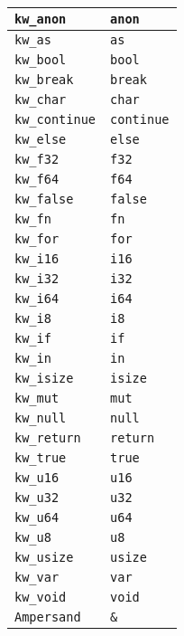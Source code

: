 \begin{xltabular}{\textwidth}{l|X}
	\texttt{kw\_anon} & \texttt{anon} \\ \hline
	\texttt{kw\_as} & \texttt{as} \\ \hline
	\texttt{kw\_bool} & \texttt{bool} \\ \hline
	\texttt{kw\_break} & \texttt{break} \\ \hline
	\texttt{kw\_char} & \texttt{char} \\ \hline
	\texttt{kw\_continue} & \texttt{continue} \\ \hline
	\texttt{kw\_else} & \texttt{else} \\ \hline
	\texttt{kw\_f32} & \texttt{f32} \\ \hline
	\texttt{kw\_f64} & \texttt{f64} \\ \hline
	\texttt{kw\_false} & \texttt{false} \\ \hline
	\texttt{kw\_fn} & \texttt{fn} \\ \hline
	\texttt{kw\_for} & \texttt{for} \\ \hline
	\texttt{kw\_i16} & \texttt{i16} \\ \hline
	\texttt{kw\_i32} & \texttt{i32} \\ \hline
	\texttt{kw\_i64} & \texttt{i64} \\ \hline
	\texttt{kw\_i8} & \texttt{i8} \\ \hline
	\texttt{kw\_if} & \texttt{if} \\ \hline
	\texttt{kw\_in} & \texttt{in} \\ \hline
	\texttt{kw\_isize} & \texttt{isize} \\ \hline
	\texttt{kw\_mut} & \texttt{mut} \\ \hline
	\texttt{kw\_null} & \texttt{null} \\ \hline
	\texttt{kw\_return} & \texttt{return} \\ \hline
	\texttt{kw\_true} & \texttt{true} \\ \hline
	\texttt{kw\_u16} & \texttt{u16} \\ \hline
	\texttt{kw\_u32} & \texttt{u32} \\ \hline
	\texttt{kw\_u64} & \texttt{u64} \\ \hline
	\texttt{kw\_u8} & \texttt{u8} \\ \hline
	\texttt{kw\_usize} & \texttt{usize} \\ \hline
	\texttt{kw\_var} & \texttt{var} \\ \hline
	\texttt{kw\_void} & \texttt{void} \\ \hline
	\texttt{Ampersand} & \texttt{\&} \\ \hline

\end{xltabular}
